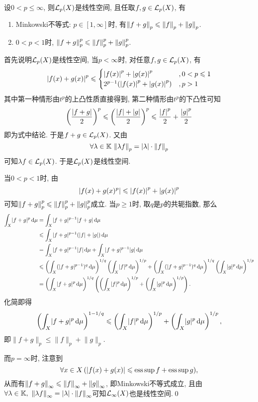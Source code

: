 	\begin{Theorem}
	设$ 0<p\leqslant\infty $, 则$ \mathcal{L}_p(X) $是线性空间, 且任取$ f, g\in\mathcal{L}_p(X) $, 有
	\begin{enumerate}[(1)]
	\item Minkowski不等式: $ p\in[1,\infty] $时, 有$ \left\| f+g \right\|_p\leqslant\left\| f \right\|_p+\left\| g \right\|_p $.
	\item $ 0<p<1 $时, $ \left\| f+g \right\|_p^p\leqslant \left\| f \right\|_p^p+\left\| g \right\|_p^p $.
	\end{enumerate}
	\end{Theorem}
	\begin{Proof}
	首先说明$ \mathcal{L}_p(X) $是线性空间, 当$ p<\infty $时, 对任意$ f, g\in\mathcal{L}_p(X) $, 有
	\[
	\left| f(x)+g(x) \right| ^p\leqslant\begin{cases}
	\left| f(x) \right| ^p+\left| g(x) \right| ^p & ,0<p\leqslant 1\\
	2^{p-1}(\left| f(x) \right| ^p+\left| g(x) \right| ^p) & ,p>1
	\end{cases}
	\]
	其中第一种情形由$ t^p $的上凸性质直接得到, 第二种情形由$ t^p $的下凸性可知
	\[
	\left(\frac{\left| f+g \right| }{2}\right)^p\leqslant\left(\frac{\left| f \right| +\left| g \right| }{2}\right)^p\leqslant\frac{\left| f \right| ^p}{2}+\frac{\left| g \right| ^p}{2}
	\]
	即为式中结论. 于是$ f+g\in\mathcal{L}_p(X) $. 又由
	\[
	\forall\lambda\in\mathbb{K}\,\left\| \lambda f \right\|_p=\left| \lambda \right| \cdot\left\| f \right\|_p
	\]
	可知$ \lambda f\in\mathcal{L}_p(X) $. 于是$ \mathcal{L}_p(X) $是线性空间.

	当$ 0<p<1 $时, 由
	\[
		\left| f(x)+g(x)^p \right| \leqslant\left| f(x) \right| ^p+\left| g(x) \right| ^p
	\]
	可知$ \left\| f+g \right\|_p^p\leqslant \left\| f \right\|_p^p+\left\| g \right\|_p^p $成立. 当$ p\geqslant 1 $时, 取$ q $是$ p $的共轭指数, 那么
	\begin{align*}
		\int_X\lvert f+g\rvert^p\,\mathrm{d}\mu&=\int_X\lvert f+g\rvert^{p-1}\lvert f+g\rvert\,\mathrm{d}\mu\\
		&\leqslant\int_X\lvert f+g\rvert^{p-1}(\lvert f\rvert+\lvert g\rvert)\,\mathrm{d}\mu\\
		&=\int_X\lvert f+g\rvert^{p-1}\lvert f\rvert\,\mathrm{d}\mu+\int_X\lvert f+g\rvert^{p-1}\lvert g\rvert\,\mathrm{d}\mu\\
		&\leqslant\left( \int_X(\lvert f+g\rvert^{p-1})^q\,\mathrm{d}\mu \right)^{1/q}\left(\int_X\lvert f\rvert^p\,\mathrm{d}\mu\right)^{1/p}+\left( \int_X(\lvert f+g\rvert^{p-1})^q\,\mathrm{d}\mu \right)^{1/q}\left(\int_X\lvert g\rvert^p\,\mathrm{d}\mu\right)^{1/p}\\
		&=\left( \int_X\lvert f+g\rvert^p\,\mathrm{d}\mu \right)^{1/q}\left( \left( \int_X\lvert f\rvert^p\,\mathrm{d}\mu \right)^{1/p}+\left( \int_X\lvert g\rvert^p\,\mathrm{d}\mu \right)^{1/p} \right).
	\end{align*}
	化简即得
	\[
		\left( \int_X\lvert f+g\rvert^p\,\mathrm{d}\mu \right)^{1-1/q}\leqslant\left( \int_X\lvert f\rvert^p\,\mathrm{d}\mu \right)^{1/p}+\left( \int_X\lvert g\rvert^p\,\mathrm{d}\mu \right)^{1/p},
	\]
	即$ \lVert f+g\rVert_p\leqslant\lVert f\rVert_p+\lVert g\rVert_p $.

	而$ p=\infty $时, 注意到
	\[
		\forall x\in X\,(\left| f(x)+g(x) \right| \leqslant\operatorname{ess\,sup} f+\operatorname{ess\,sup} g),
	\]
	从而有$ \left\| f+g \right\|_\infty\leqslant\left\| f \right\|_\infty+\left\| g \right\|_\infty $, 即Minkowski不等式成立, 且由$ \forall\lambda\in\mathbb{K},\ \left\| \lambda f \right\|_\infty=\left| \lambda \right| \cdot\left\| f \right\|_\infty $可知$ \mathcal{L}_\infty(X) $也是线性空间.\qed
	\end{Proof}

